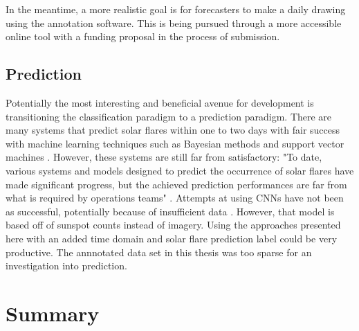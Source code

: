 \documentclass[twoside]{report}
\begin{document}
In the meantime, a more realistic goal is for forecasters to make a daily drawing using the annotation software. This is being pursued through a more accessible online tool with a funding proposal in the process of submission. 

\subsection{Prediction}
Potentially the most interesting and beneficial avenue for development is transitioning the classification paradigm to a prediction paradigm. There are many systems that predict solar flares within one to two days with fair success with machine learning techniques such as Bayesian methods \cite{predict1} and support vector machines \cite{predict2}. However, these systems are still far from satisfactory: "To date, various systems and models designed to predict the occurrence of solar flares have made significant progress, but the achieved prediction performances are far from what is required by operations teams" \cite{predict3}. Attempts at using CNNs have not been as successful, potentially because of insufficient data \cite{predict4}. However, that model is based off of sunspot counts instead of imagery. Using the approaches presented here with an added time domain and solar flare prediction label could be very productive. The annnotated data set in this thesis was too sparse for an investigation into prediction. 

\section{Summary}




\end{document}

